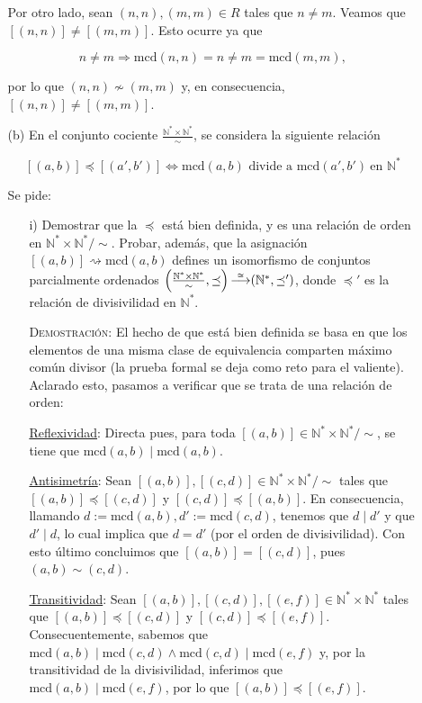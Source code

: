 \documentclass{article}
\begin{document}
\begin{enumerate}
\begin{enumerate}
        Por otro lado, sean $(n, n), (m, m) \in R$ tales que $n \neq m$. Veamos que $[(n, n)] \neq [(m, m)]$. Esto ocurre ya que

        \[n \neq m \Longrightarrow \text{mcd}(n, n) = n \neq m = \text{mcd}(m, m),\]

        por lo que $(n, n) \nsim (m, m)$ y, en consecuencia, $[(n, n)] \neq [(m, m)]$.

        \item[(b)] En el conjunto cociente $\frac{\mathbb{N}^* \times \mathbb{N}^*}{\sim}$, se considera la siguiente relación

        \[[(a, b)] \preceq [(a', b')] \iff \text{mcd}(a, b) \text{ divide a mcd}(a', b')\ \text{en } \mathbb{N}^*\]

        Se pide:

        \begin{enumerate}
            \item[i)] Demostrar que la $\preceq$ está bien definida, y es una relación de orden en $\mathbb{N}^* \times \mathbb{N}^* / \sim$. Probar, además, que la asignación $[(a, b)] \rightsquigarrow \text{mcd}(a, b)$ defines un isomorfismo de conjuntos parcialmente ordenados $\left(\frac{\mathbb{N}^* \times \mathbb{N}^*}{\sim}, \preceq\right) \accentset{\cong}{\longrightarrow} (\mathbb{N}^*, \preceq')$, donde $\preceq'$ es la relación de divisivilidad en $\mathbb{N}^*$.

            \textsc{Demostración}: El hecho de que está bien definida se basa en que los elementos de una misma clase de equivalencia comparten máximo común divisor (la prueba formal se deja como reto para el valiente). Aclarado esto, pasamos a verificar que se trata de una relación de orden:

            \underline{Reflexividad}: Directa pues, para toda $[(a, b)] \in \mathbb{N}^* \times \mathbb{N}^* / \sim$, se tiene que $\text{mcd}(a, b) \mid \text{mcd}(a, b)$.

            \underline{Antisimetría}: Sean $[(a, b)], [(c, d)] \in \mathbb{N}^* \times \mathbb{N}^* / \sim$ tales que $[(a, b)] \preceq [(c, d)]$ y $[(c, d)] \preceq [(a, b)]$. En consecuencia, llamando $d := \text{mcd}(a, b), d' := \text{mcd}(c, d)$, tenemos que $d \mid d'$ y que $d' \mid d$, lo cual implica que $d = d'$ (por el orden de divisivilidad). Con esto último concluimos que $[(a, b)] = [(c, d)]$, pues $(a, b) \sim (c, d)$.

            \underline{Transitividad}: Sean $[(a, b)], [(c, d)], [(e, f)] \in \mathbb{N}^* \times \mathbb{N}^*$ tales que $[(a, b)] \preceq [(c, d)]$ y $[(c, d)] \preceq [(e, f)]$. Consecuentemente, sabemos que $\text{mcd}(a, b) \mid \text{mcd}(c, d) \land \text{mcd}(c, d) \mid \text{mcd}(e, f)$ y, por la transitividad de la divisivilidad, inferimos que $\text{mcd}(a, b) \mid \text{mcd}(e, f)$, por lo que $[(a, b)] \preceq [(e, f)]$.


\end{enumerate}
\end{enumerate}
\end{enumerate}
\end{document}
